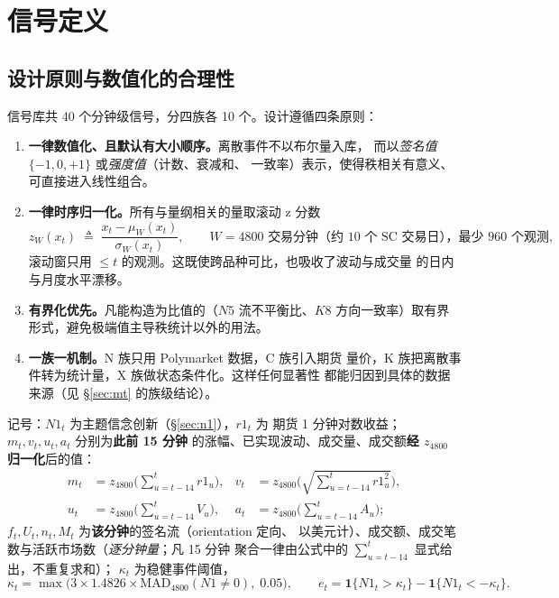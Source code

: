 \documentclass[11pt, a4paper]{ctexart}
\newcommand{\eqdef}{\;\triangleq\;}
\begin{document}
\section{信号定义}\label{sec:signal}

\subsection{设计原则与数值化的合理性}

信号库共 40 个分钟级信号，分四族各 10 个。设计遵循四条原则：

\begin{enumerate}
\item \textbf{一律数值化、且默认有大小顺序。}离散事件不以布尔量入库，
  而以\emph{签名值} $\{-1,0,+1\}$ 或\emph{强度值}（计数、衰减和、
  一致率）表示，使得秩相关有意义、可直接进入线性组合。
\item \textbf{一律时序归一化。}所有与量纲相关的量取滚动 z 分数
  \[
  z_W(x_t) \eqdef \frac{x_t - \mu_{W}(x_t)}{\sigma_{W}(x_t)},
  \qquad W=4800 \text{ 交易分钟（约 10 个 SC 交易日），最少 960 个观测},
  \]
  滚动窗只用 $\le t$ 的观测。这既使跨品种可比，也吸收了波动与成交量
  的日内与月度水平漂移。
\item \textbf{有界化优先。}凡能构造为比值的（$N5$ 流不平衡比、$K8$
  方向一致率）取有界形式，避免极端值主导秩统计以外的用法。
\item \textbf{一族一机制。}N 族只用 Polymarket 数据，C 族引入期货
  量价，K 族把离散事件转为统计量，X 族做状态条件化。这样任何显著性
  都能归因到具体的数据来源（见 \S\ref{sec:mt} 的族级结论）。
\end{enumerate}

\noindent 记号：$N1_t$ 为主题信念创新（\S\ref{sec:n1}），$r1_t$ 为
期货 1 分钟对数收益；$m_t, v_t, u_t, a_t$ 分别为\textbf{此前 15 分钟}
的涨幅、已实现波动、成交量、成交额\textbf{经 $z_{4800}$ 归一化}后的值：
\[
\begin{aligned}
m_t &= z_{4800}\Big(\sum_{u=t-14}^{t} r1_u\Big), &
v_t &= z_{4800}\Big(\sqrt{\textstyle\sum_{u=t-14}^{t} r1_u^2}\Big),\\[2pt]
u_t &= z_{4800}\Big(\sum_{u=t-14}^{t} V_u\Big), &
a_t &= z_{4800}\Big(\sum_{u=t-14}^{t} A_u\Big);
\end{aligned}
\]
$f_t, U_t, n_t, M_t$ 为\textbf{该分钟}的签名流（orientation 定向、
以美元计）、成交额、成交笔数与活跃市场数（\emph{逐分钟量}；凡 15 分钟
聚合一律由公式中的 $\sum_{u=t-14}^{t}$ 显式给出，不重复求和）；
$\kappa_t$ 为稳健事件阈值，
\[
\kappa_t = \max\big(3\times1.4826\times\mathrm{MAD}_{4800}(N1\!\neq\!0),\;
0.05\big),\qquad
e_t = \mathbf{1}\{N1_t>\kappa_t\}-\mathbf{1}\{N1_t<-\kappa_t\}.
\]
\end{document}
